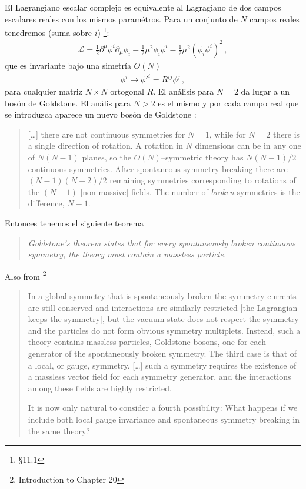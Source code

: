 El Lagrangiano escalar complejo es equivalente al Lagragiano de dos campos escalares reales con los mismos paramétros. Para un conjunto de $N$ campos reales tenedremos (suma sobre $i$) \cite{Peskin}\footnote{\S 11.1}: 
\begin{align}
  \mathcal{L}=\frac{1}{2}\partial^\mu\phi^i\partial_\mu\phi_i-\frac{1}{2}\mu^2\phi_i\phi^i-\frac{1}{2}\mu^2\left(\phi_i\phi^i\right)^2\,,
\end{align}
que es invariante bajo una simetría $O(N)$
\begin{align}
  \phi^i\to{\phi'}^i=R^{ij}\phi^j\,,
\end{align}
para cualquier matriz $N\times  N$ ortogonal $R$. El análisis para $N=2$ da lugar a un bosón de Goldstone. El anális para $N>2$ es el mismo y por cada campo real que se introduzca aparece un nuevo bosón de Goldstone \cite{Peskin}:
\begin{quote}
  [\ldots] there are not continuous symmetries for $N=1$, while for $N=2$ there is a single direction of rotation. A rotation in $N$ dimensions can be in any one of $N(N-1)$ planes, so the $O(N)$--symmetric theory has $N(N-1)/2$ continuous symmetries. After spontaneous symmetry breaking there are $(N-1)(N-2)/2$  remaining symmetries corresponding to rotations of the $(N-1)$ [non massive] fields. The number of \emph{broken} symmetries is the difference, $N-1$.
\end{quote}
Entonces tenemos el siguiente teorema \cite{Peskin}
\begin{quote}
\emph{Goldstone's theorem states that for every spontaneously broken continuous symmetry, the theory must contain a massless particle.}
\end{quote}

Also from \cite{Peskin}\footnote{Introduction to Chapter 20}
\begin{quote}
  In a global symmetry  that is spontaneously broken the symmetry currents are still conserved and interactions are similarly restricted [the Lagrangian keeps the symmetry], but the vacuum state does not respect the symmetry and the particles do not form obvious symmetry multiplets. Instead, such a theory contains massless particles, Goldstone bosons, one for each generator of the spontaneously broken symmetry. The third case is that of a local, or gauge, symmetry. [\ldots] such a symmetry requires the existence of a massless vector field for each symmetry generator, and the interactions among these fields are highly restricted.

It is now only natural to consider a fourth possibility: What happens if we include both local gauge invariance  and spontaneous symmetry breaking in the same theory?
\end{quote}

